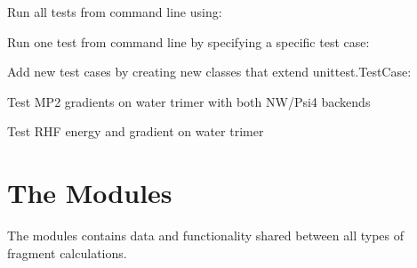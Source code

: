 \documentclass[letterpaper,10pt,english]{sphinxmanual}
\begin{document}
Run all tests from command line using:

\begin{sphinxVerbatim}[commandchars=\\\{\}]
   
\end{sphinxVerbatim}

Run one test from command line by specifying a specific test case:

\begin{sphinxVerbatim}[commandchars=\\\{\}]
   
\end{sphinxVerbatim}

Add new test cases by creating new classes that extend unittest.TestCase:

\begin{fulllineitems}
\label{\detokenize{test:test.test.TestTrimerMP2}}
Test MP2 gradients on water trimer with both NW/Psi4 backends

\end{fulllineitems}


\begin{fulllineitems}
\label{\detokenize{test:test.test.TestTrimerRHF}}
Test RHF energy and gradient on water trimer

\end{fulllineitems}



\section{The  Modules}
\label{\detokenize{globals::doc}}\label{\detokenize{globals:the-globals-modules}}
The  modules contains data and functionality
shared between all types of fragment calculations.
\end{document}
